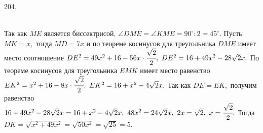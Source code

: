 204. \begin{figure}[ht!]
\end{figure}\\
Так как $ME$ является биссектрисой, $\angle DME=\angle KME=90^\circ:2=45^\circ.$ Пусть $MK=x,$ тогда $MD=7x$ и по теореме косинусов для треугольника $DME$ имеет место соотношение $DE^2=49x^2+16-56x\cdot \cfrac{\sqrt{2}}{2},\ DE^2=16+49x^2-28\sqrt{2}x.$ По теореме косинусов для треугольника $EMK$ имеет место равенство $EK^2=x^2+16-8x\cdot \cfrac{\sqrt{2}}{2},\ EK^2=16+x^2-4\sqrt{2}x.$ Так как $DE=EK,$ получим равенство $16+49x^2-28\sqrt{2}x=16+x^2-4\sqrt{2}x,\ 48x^2=24\sqrt{2}x,\ 2x=\sqrt{2},\ x=\cfrac{\sqrt{2}}{2}.$ Тогда $DK=\sqrt{x^2+49x^2}=\sqrt{50x^2}=\sqrt{25}=5.$\\

